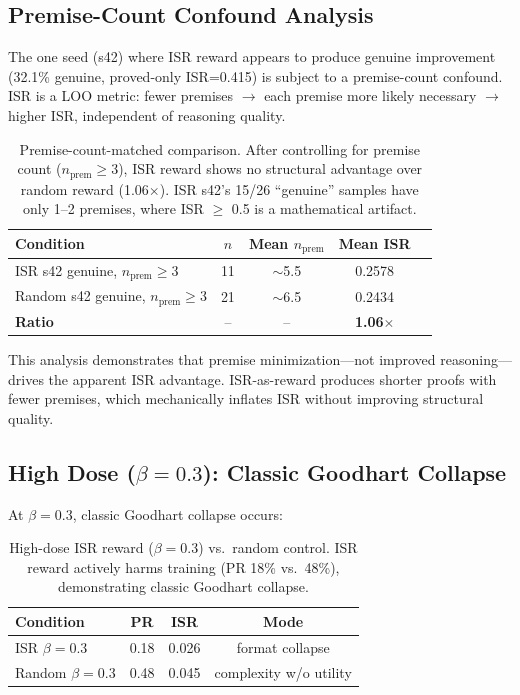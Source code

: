 \documentclass[11pt,a4paper]{article}
\newcommand{\ISR}{\textsc{ISR}}
\begin{document}
\subsection{Premise-Count Confound Analysis}

The one seed (s42) where ISR reward appears to produce genuine improvement (32.1\% genuine, proved-only ISR=0.415) is subject to a premise-count confound. ISR is a LOO metric: fewer premises $\to$ each premise more likely necessary $\to$ higher ISR, independent of reasoning quality.

\begin{table}[h]
\centering
\small
\begin{tabular}{lcccc}
\toprule
\textbf{Condition} & \textbf{$n$} & \textbf{Mean $n_{\text{prem}}$} & \textbf{Mean \ISR{}} \\
\midrule
ISR s42 genuine, $n_{\text{prem}} \geq 3$ & 11 & $\sim$5.5 & 0.2578 \\
Random s42 genuine, $n_{\text{prem}} \geq 3$ & 21 & $\sim$6.5 & 0.2434 \\
\midrule
\textbf{Ratio} & -- & -- & \textbf{1.06$\times$} \\
\bottomrule
\end{tabular}
\caption{Premise-count-matched comparison. After controlling for premise count ($n_{\text{prem}} \geq 3$), ISR reward shows no structural advantage over random reward (1.06$\times$). ISR s42's 15/26 ``genuine'' samples have only 1--2 premises, where ISR $\geq$ 0.5 is a mathematical artifact.}
\label{tab:premise_matched}
\end{table}

This analysis demonstrates that premise minimization---not improved reasoning---drives the apparent ISR advantage. ISR-as-reward produces shorter proofs with fewer premises, which mechanically inflates ISR without improving structural quality.

\subsection{High Dose ($\beta{=}0.3$): Classic Goodhart Collapse}

At $\beta{=}0.3$, classic Goodhart collapse occurs:

\begin{table}[h]
\centering
\small
\begin{tabular}{lccc}
\toprule
\textbf{Condition} & \textbf{PR} & \textbf{\ISR{}} & \textbf{Mode} \\
\midrule
ISR $\beta{=}0.3$ & 0.18 & 0.026 & format collapse \\
Random $\beta{=}0.3$ & 0.48 & 0.045 & complexity w/o utility \\
\bottomrule
\end{tabular}
\caption{High-dose ISR reward ($\beta{=}0.3$) vs.\ random control. ISR reward actively harms training (PR 18\% vs.\ 48\%), demonstrating classic Goodhart collapse.}
\label{tab:high_dose}
\end{table}
\end{document}
